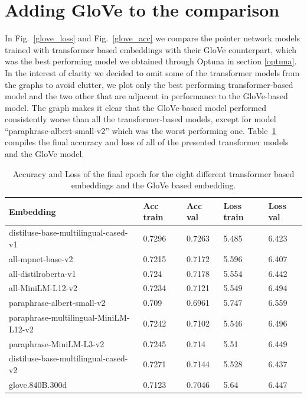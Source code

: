 \section{Adding GloVe to the comparison}


In Fig.~\ref{glove_loss} and Fig.~\ref{glove_acc} we compare the pointer network models trained with transformer based embeddings with their GloVe counterpart, which was the best performing model we obtained through Optuna in section \ref{optuna}. In the interest of clarity we decided to omit some of the  transformer models from the graphs to avoid clutter, we plot only the best performing transformer-based model and the two other that are adjacent in performance to the GloVe-based model. The graph makes it clear that the GloVe-based model performed consistently worse than all the transformer-based models, except for model ``paraphrase-albert-small-v2'' which was the worst performing one. Table~\ref{table:glove} compiles the final accuracy and loss of all of the presented transformer models and the GloVe model.

\begin{table}[]
\begin{tabular}{l|llll}
Embedding                             & Acc train & Acc val & Loss train & Loss val \\ \hline
distiluse-base-multilingual-cased-v1  & 0.7296    & 0.7263  & 5.485      & 6.423    \\
all-mpnet-base-v2                     & 0.7215    & 0.7172  & 5.596      & 6.407    \\
all-distilroberta-v1                  & 0.724     & 0.7178  & 5.554      & 6.442    \\
all-MiniLM-L12-v2                     & 0.7234    & 0.7121  & 5.549      & 6.494    \\
paraphrase-albert-small-v2            & 0.709     & 0.6961  & 5.747      & 6.559    \\
paraphrase-multilingual-MiniLM-L12-v2 & 0.7242    & 0.7102  & 5.546      & 6.496    \\
paraphrase-MiniLM-L3-v2               & 0.7245    & 0.714   & 5.51       & 6.449    \\
distiluse-base-multilingual-cased-v2  & 0.7271    & 0.7144  & 5.528      & 6.437    \\
\rowcolor[HTML]{F9F5E9} 
glove.840B.300d                         & 0.7123    & 0.7046  & 5.64       & 6.447   
\end{tabular}
\caption{Accuracy and Loss of the final epoch for the eight different transformer based embeddings and the GloVe based embedding.}
\label{table:glove}
\end{table}


